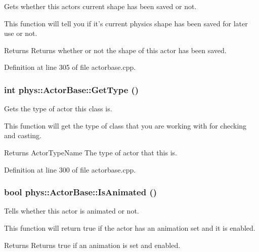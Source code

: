 Gets whether this actors current shape has been saved or not. 

This function will tell you if it's current physics shape has been saved for later use or not. \begin{DoxyReturn}{Returns}
Returns whether or not the shape of this actor has been saved. 
\end{DoxyReturn}


Definition at line 305 of file actorbase.cpp.

\hypertarget{classphys_1_1ActorBase_ab8bedea2ef0ce9194731ebeb886333ff}{
\subsubsection[{GetType}]{\setlength{\rightskip}{0pt plus 5cm}int phys::ActorBase::GetType ()}}
\label{d8/d0f/classphys_1_1ActorBase_ab8bedea2ef0ce9194731ebeb886333ff}


Gets the type of actor this class is. 

This function will get the type of class that you are working with for checking and casting. \begin{DoxyReturn}{Returns}
ActorTypeName The type of actor that this is. 
\end{DoxyReturn}


Definition at line 300 of file actorbase.cpp.

\hypertarget{classphys_1_1ActorBase_ac98f9fdae0da939e352f8fcff217457c}{
\subsubsection[{IsAnimated}]{\setlength{\rightskip}{0pt plus 5cm}bool phys::ActorBase::IsAnimated ()}}
\label{d8/d0f/classphys_1_1ActorBase_ac98f9fdae0da939e352f8fcff217457c}


Tells whether this actor is animated or not. 

This function will return true if the actor has an animation set and it is enabled. \begin{DoxyReturn}{Returns}
Returns true if an animation is set and enabled. 
\end{DoxyReturn}


